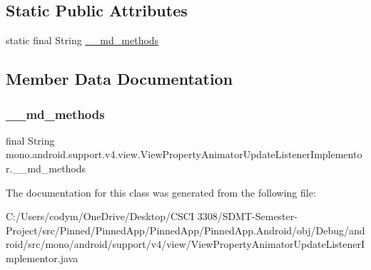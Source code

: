 \subsection*{Static Public Attributes}
\begin{DoxyCompactItemize}
\item 
static final String \hyperlink{classmono_1_1android_1_1support_1_1v4_1_1view_1_1_view_property_animator_update_listener_implementor_af516b0230225633ea96b66269a4242c3}{\+\_\+\+\_\+md\+\_\+methods}
\end{DoxyCompactItemize}


\subsection{Member Data Documentation}
\mbox{\label{classmono_1_1android_1_1support_1_1v4_1_1view_1_1_view_property_animator_update_listener_implementor_af516b0230225633ea96b66269a4242c3}} 
\subsubsection{\texorpdfstring{\+\_\+\+\_\+md\+\_\+methods}{\_\_md\_methods}}
{\footnotesize\ttfamily final String mono.\+android.\+support.\+v4.\+view.\+View\+Property\+Animator\+Update\+Listener\+Implementor.\+\_\+\+\_\+md\+\_\+methods\hspace{0.3cm}{\ttfamily [static]}}



The documentation for this class was generated from the following file\+:\begin{DoxyCompactItemize}
\item 
C\+:/\+Users/codym/\+One\+Drive/\+Desktop/\+C\+S\+C\+I 3308/\+S\+D\+M\+T-\/\+Semester-\/\+Project/src/\+Pinned/\+Pinned\+App/\+Pinned\+App/\+Pinned\+App.\+Android/obj/\+Debug/android/src/mono/android/support/v4/view/View\+Property\+Animator\+Update\+Listener\+Implementor.\+java\end{DoxyCompactItemize}
